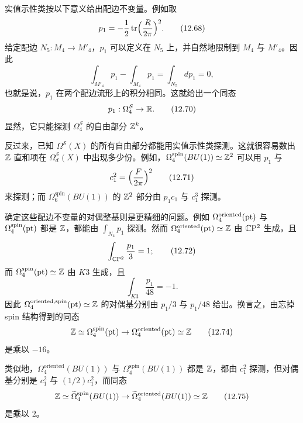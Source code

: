 实值示性类按以下意义给出配边不变量。例如取
\begin{equation}
  p_1=-\frac{1}{2}\operatorname{tr}\Bigl(\frac{R}{2\pi}\Bigr)^2 .
  \tag{12.68}
\end{equation}
给定配边 $N_5:M_4\to M'_4$，$p_1$ 可以定义在 $N_5$ 上，并自然地限制到 $M_4$ 与 $M'_4$。因此
\begin{equation}
  \int_{M'_4}p_1-\int_{M_4}p_1=\int_{N_5}dp_1=0,
  \tag{12.69}
\end{equation}
也就是说，$p_1$ 在两个配边流形上的积分相同。这就给出一个同态
\begin{equation}
  p_1:\Omega^{\mathcal S}_4\to\mathbb{R} .
  \tag{12.70}
\end{equation}
显然，它只能探测 $\Omega^{\mathcal S}_4$ 的自由部分 $\mathbb{Z}^k$。

反过来，已知 $\Omega^{\mathcal S}(X)$ 的所有自由部分都能用实值示性类探测。这就很容易数出 $\mathbb{Z}$ 直和项在 $\Omega^{\mathcal S}_d(X)$ 中出现多少份。例如，$\Omega^{\mathrm{spin}}_4(BU(1))\simeq\mathbb{Z}^2$ 可以用 $p_1$ 与
\begin{equation}
  c_1^2=\Bigl(\frac{F}{2\pi}\Bigr)^2
  \tag{12.71}
\end{equation}
来探测；而 $\Omega^{\mathrm{spin}}_6(BU(1))$ 的 $\mathbb{Z}^2$ 部分由 $p_1c_1$ 与 $c_1^3$ 探测。

确定这些配边不变量的对偶整基则是更精细的问题。例如 $\Omega^{\mathrm{oriented}}_4(\mathrm{pt})$ 与 $\Omega^{\mathrm{spin}}_4(\mathrm{pt})$ 都是 $\mathbb{Z}$，都能由 $\int_{N_4}p_1$ 探测。然而 $\Omega^{\mathrm{oriented}}_4(\mathrm{pt})\simeq\mathbb{Z}$ 由 $\mathbb{C}\mathrm{P}^2$ 生成，且
\begin{equation}
  \int_{\mathbb{C}\mathrm{P}^2}\frac{p_1}{3}=1 ;
  \tag{12.72}
\end{equation}
而 $\Omega^{\mathrm{spin}}_4(\mathrm{pt})\simeq\mathbb{Z}$ 由 $K3$ 生成，且
\begin{equation}
  \int_{K3}\frac{p_1}{48}=-1 .
  \tag{12.73}
\end{equation}
因此 $\Omega^{\mathrm{oriented},\mathrm{spin}}_4(\mathrm{pt})\simeq\mathbb{Z}$ 的对偶基分别由 $p_1/3$ 与 $p_1/48$ 给出。换言之，由忘掉 spin 结构得到的同态
\begin{equation}
  \mathbb{Z}\simeq\Omega^{\mathrm{spin}}_4(\mathrm{pt})\to
  \Omega^{\mathrm{oriented}}_4(\mathrm{pt})\simeq\mathbb{Z}
  \tag{12.74}
\end{equation}
是乘以 $-16$。

类似地，$\Omega^{\mathrm{oriented}}_4(BU(1))$ 与 $\Omega^{\mathrm{spin}}_4(BU(1))$ 都是 $\mathbb{Z}$，都由 $c_1^2$ 探测，但对偶基分别是 $c_1^2$ 与 $(1/2)c_1^2$，而同态
\begin{equation}
  \mathbb{Z}\simeq\widetilde{\Omega}^{\mathrm{spin}}_4(BU(1))\to
  \widetilde{\Omega}^{\mathrm{oriented}}_4(BU(1))\simeq\mathbb{Z}
  \tag{12.75}
\end{equation}
是乘以 $2$。

